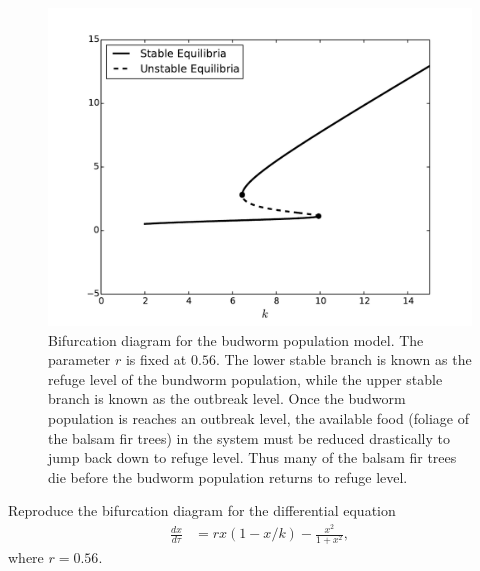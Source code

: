 \begin{figure}[ht]
\centering
\includegraphics[width=\textwidth]{BudwormPopulation.pdf}
\caption{Bifurcation diagram for the budworm population model. The parameter $r$ is fixed at $0.56.$ The lower stable branch is known as the refuge level of the bundworm population, while the upper stable branch is known as the outbreak level. Once the budworm population is reaches an outbreak level, the available food (foliage of the balsam fir trees) in the system must be reduced drastically to jump back down to refuge level.  Thus many of the balsam fir trees die before the budworm population returns to refuge level.}
\label{bifurcation:budworm}
\end{figure}





\begin{problem}
Reproduce the bifurcation diagram for the differential equation
\begin{align*}
	\frac{dx}{d \tau} &= rx(1-x/k) - \frac{x^2}{1+x^2},
\end{align*}
where $r = 0.56$.
\end{problem}






